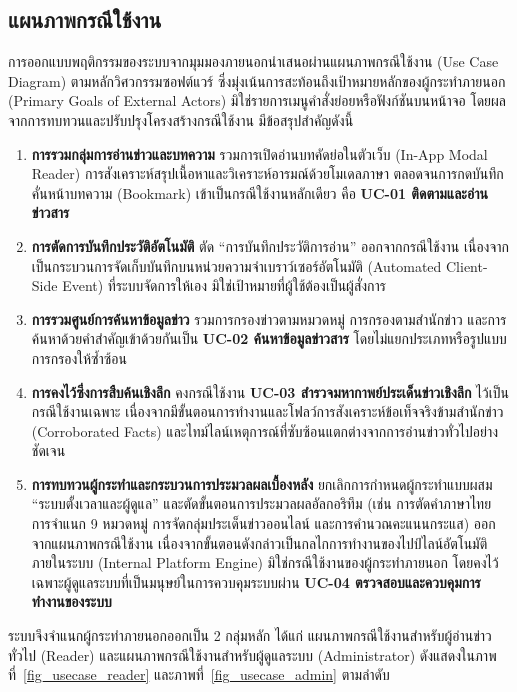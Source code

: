 \subsection{แผนภาพกรณีใช้งาน}

การออกแบบพฤติกรรมของระบบจากมุมมองภายนอกนำเสนอผ่านแผนภาพกรณีใช้งาน (Use Case Diagram) ตามหลักวิศวกรรมซอฟต์แวร์ ซึ่งมุ่งเน้นการสะท้อนถึงเป้าหมายหลักของผู้กระทำภายนอก (Primary Goals of External Actors) มิใช่รายการเมนูคำสั่งย่อยหรือฟังก์ชันบนหน้าจอ โดยผลจากการทบทวนและปรับปรุงโครงสร้างกรณีใช้งาน มีข้อสรุปสำคัญดังนี้
\begin{enumerate}
    \item \textbf{การรวมกลุ่มการอ่านข่าวและบทความ} รวมการเปิดอ่านบทคัดย่อในตัวเว็บ (In-App Modal Reader) การสังเคราะห์สรุปเนื้อหาและวิเคราะห์อารมณ์ด้วยโมเดลภาษา ตลอดจนการกดบันทึกคั่นหน้าบทความ (Bookmark) เข้าเป็นกรณีใช้งานหลักเดียว คือ \textbf{UC-01 ติดตามและอ่านข่าวสาร} 
    \item \textbf{การตัดการบันทึกประวัติอัตโนมัติ} ตัด ``การบันทึกประวัติการอ่าน'' ออกจากกรณีใช้งาน เนื่องจากเป็นกระบวนการจัดเก็บบันทึกบนหน่วยความจำเบราว์เซอร์อัตโนมัติ (Automated Client-Side Event) ที่ระบบจัดการให้เอง มิใช่เป้าหมายที่ผู้ใช้ต้องเป็นผู้สั่งการ
    \item \textbf{การรวมศูนย์การค้นหาข้อมูลข่าว} รวมการกรองข่าวตามหมวดหมู่ การกรองตามสำนักข่าว และการค้นหาด้วยคำสำคัญเข้าด้วยกันเป็น \textbf{UC-02 ค้นหาข้อมูลข่าวสาร} โดยไม่แยกประเภทหรือรูปแบบการกรองให้ซ้ำซ้อน
    \item \textbf{การคงไว้ซึ่งการสืบค้นเชิงลึก} คงกรณีใช้งาน \textbf{UC-03 สำรวจมหากาพย์ประเด็นข่าวเชิงลึก} ไว้เป็นกรณีใช้งานเฉพาะ เนื่องจากมีขั้นตอนการทำงานและโฟลว์การสังเคราะห์ข้อเท็จจริงข้ามสำนักข่าว (Corroborated Facts) และไทม์ไลน์เหตุการณ์ที่ซับซ้อนแตกต่างจากการอ่านข่าวทั่วไปอย่างชัดเจน
    \item \textbf{การทบทวนผู้กระทำและกระบวนการประมวลผลเบื้องหลัง} ยกเลิกการกำหนดผู้กระทำแบบผสม ``ระบบตั้งเวลาและผู้ดูแล'' และตัดขั้นตอนการประมวลผลอัลกอริทึม (เช่น การตัดคำภาษาไทย การจำแนก 9 หมวดหมู่ การจัดกลุ่มประเด็นข่าวออนไลน์ และการคำนวณคะแนนกระแส) ออกจากแผนภาพกรณีใช้งาน เนื่องจากขั้นตอนดังกล่าวเป็นกลไกการทำงานของไปป์ไลน์อัตโนมัติภายในระบบ (Internal Platform Engine) มิใช่กรณีใช้งานของผู้กระทำภายนอก โดยคงไว้เฉพาะผู้ดูแลระบบที่เป็นมนุษย์ในการควบคุมระบบผ่าน \textbf{UC-04 ตรวจสอบและควบคุมการทำงานของระบบ}
\end{enumerate}

ระบบจึงจำแนกผู้กระทำภายนอกออกเป็น 2 กลุ่มหลัก ได้แก่ แผนภาพกรณีใช้งานสำหรับผู้อ่านข่าวทั่วไป (Reader) และแผนภาพกรณีใช้งานสำหรับผู้ดูแลระบบ (Administrator) ดังแสดงในภาพที่~\ref{fig_usecase_reader} และภาพที่~\ref{fig_usecase_admin} ตามลำดับ

